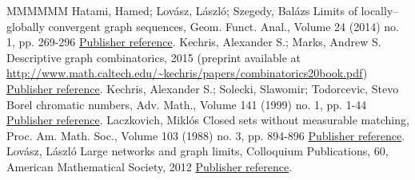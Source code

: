 \begin{thebibliography}{MMMMMM}
 Hatami, Hamed; Lovász, László; Szegedy, Balázs Limits of locally–globally convergent graph sequences, Geom. Funct. Anal., Volume 24 (2014) no. 1, pp. 269-296 \href{https://ahl.centre-mersenne.org/item/AHL_2021__4__1705_0/#hatami2014limits}{Publisher reference}.
 Kechris, Alexander S.; Marks, Andrew S. Descriptive graph combinatorics, 2015 (preprint available at \url{http://www.math.caltech.edu/~kechris/papers/combinatorics20book.pdf}) \href{https://ahl.centre-mersenne.org/item/AHL_2021__4__1705_0/#kechris2015descriptive}{Publisher reference}.
 Kechris, Alexander S.; Solecki, Slawomir; Todorcevic, Stevo Borel chromatic numbers, Adv. Math., Volume 141 (1999) no. 1, pp. 1-44 \href{https://ahl.centre-mersenne.org/item/AHL_2021__4__1705_0/#kechris1999borel}{Publisher reference}.
 Laczkovich, Miklós Closed sets without measurable matching, Proc. Am. Math. Soc., Volume 103 (1988) no. 3, pp. 894-896 \href{https://ahl.centre-mersenne.org/item/AHL_2021__4__1705_0/#laczkovich1988closed}{Publisher reference}.
 Lovász, László Large networks and graph limits, Colloquium Publications, 60, American Mathematical Society, 2012 \href{https://ahl.centre-mersenne.org/item/AHL_2021__4__1705_0/#lovasz2012large}{Publisher reference}.
\end{thebibliography}
